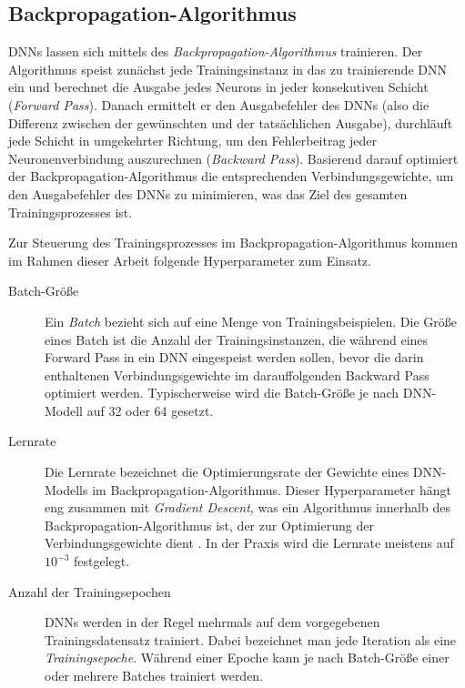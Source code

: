 \subsection{Backpropagation-Algorithmus}

DNNs lassen sich mittels des \emph{Backpropagation-Algorithmus} \cite{backpropapaper,Goodfellow-et-al-2016} trainieren. Der Algorithmus speist zunächst jede Trainingsinstanz in das zu trainierende DNN ein und berechnet die Ausgabe jedes Neurons in jeder konsekutiven Schicht (\emph{Forward Pass}). Danach ermittelt er den Ausgabefehler des DNNs (also die Differenz zwischen der gewünschten und der tatsächlichen Ausgabe), durchläuft jede Schicht in umgekehrter Richtung, um den Fehlerbeitrag jeder Neuronenverbindung auszurechnen (\emph{Backward Pass}). Basierend darauf optimiert der Backpropagation-Algorithmus die entsprechenden Verbindungsgewichte, um den Ausgabefehler des DNNs zu minimieren, was das Ziel des gesamten Trainingsprozesses ist.

Zur Steuerung des Trainingsprozesses im Backpropagation-Algorithmus kommen im Rahmen dieser Arbeit folgende Hyperparameter zum Einsatz.

\begin{description}
	\item[Batch-Größe] 
	
	Ein \emph{Batch} bezieht sich auf eine Menge von Trainingsbeispielen. Die Größe eines Batch ist die Anzahl der Trainingsinstanzen, die während eines Forward Pass in ein DNN eingespeist werden sollen, bevor die darin enthaltenen Verbindungsgewichte im darauffolgenden Backward Pass optimiert werden. Typischerweise wird die Batch-Größe je nach DNN-Modell auf 32 oder 64 gesetzt.
	
	\item[Lernrate] 
	
	Die Lernrate bezeichnet die Optimierungsrate der Gewichte eines DNN-Modells im Backpropagation-Algorithmus. Dieser Hyperparameter hängt eng zusammen mit \emph{Gradient Descent}, was ein Algorithmus innerhalb des Backpropagation-Algorithmus ist, der zur Optimierung der Verbindungsgewichte dient \cite{ruder2017overview,chandra2019gradient}. In der Praxis wird die Lernrate meistens auf $10^{-3}$ festgelegt.
	
	\item[Anzahl der Trainingsepochen]
	
	DNNs werden in der Regel mehrmals auf dem vorgegebenen Trainingsdatensatz trainiert. Dabei bezeichnet man jede Iteration als eine \emph{Trainingsepoche}. Während einer Epoche kann je nach Batch-Größe einer oder mehrere Batches trainiert werden.	
	 
\end{description}

